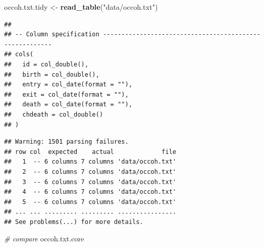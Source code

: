 \documentclass[
]{book}
\newenvironment{Shaded}{\begin{snugshade}}{\end{snugshade}}
\newcommand{\CommentTok}[1]{\textcolor[rgb]{0.56,0.35,0.01}{\textit{#1}}}
\newcommand{\FunctionTok}[1]{\textcolor[rgb]{0.13,0.29,0.53}{\textbf{#1}}}
\newcommand{\NormalTok}[1]{#1}
\newcommand{\OtherTok}[1]{\textcolor[rgb]{0.56,0.35,0.01}{#1}}
\newcommand{\StringTok}[1]{\textcolor[rgb]{0.31,0.60,0.02}{#1}}
\begin{document}
\begin{Shaded}
\begin{Highlighting}[]
\NormalTok{occoh.txt.tidy }\OtherTok{\textless{}{-}} \FunctionTok{read\_table}\NormalTok{(}\StringTok{"data/occoh.txt"}\NormalTok{)}
\end{Highlighting}
\end{Shaded}

\begin{verbatim}
## 
## -- Column specification --------------------------------------------------------
## cols(
##   id = col_double(),
##   birth = col_double(),
##   entry = col_date(format = ""),
##   exit = col_date(format = ""),
##   death = col_date(format = ""),
##   chdeath = col_double()
## )
\end{verbatim}

\begin{verbatim}
## Warning: 1501 parsing failures.
## row col  expected    actual             file
##   1  -- 6 columns 7 columns 'data/occoh.txt'
##   2  -- 6 columns 7 columns 'data/occoh.txt'
##   3  -- 6 columns 7 columns 'data/occoh.txt'
##   4  -- 6 columns 7 columns 'data/occoh.txt'
##   5  -- 6 columns 7 columns 'data/occoh.txt'
## ... ... ......... ......... ................
## See problems(...) for more details.
\end{verbatim}

\begin{Shaded}
\begin{Highlighting}[]
\CommentTok{\# compare}
\NormalTok{occoh.txt.core}
\end{Highlighting}
\end{Shaded}
\end{document}
